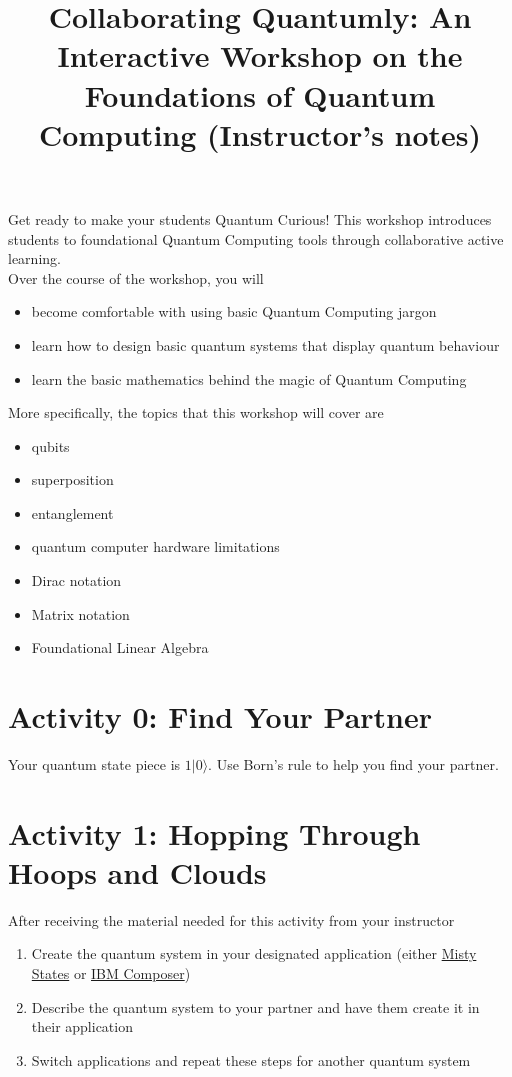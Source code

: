 \documentclass{article}
\title{Collaborating Quantumly: An Interactive Workshop on the Foundations of Quantum Computing (Instructor's notes)}
\begin{document}
\maketitle

Get ready to make your students Quantum Curious! This workshop introduces students to foundational Quantum Computing tools through collaborative active learning.
\\
Over the course of the workshop, you will
\begin{itemize}
    \item become comfortable with using basic Quantum Computing jargon
    \item learn how to design basic quantum systems that display quantum behaviour
    \item learn the basic mathematics behind the magic of Quantum Computing
\end{itemize}

\newline \newline

More specifically, the topics that this workshop will cover are
\begin{itemize}
    \item qubits
    \item superposition
    \item entanglement
    \item quantum computer hardware limitations
    \item Dirac notation
    \item Matrix notation
    \item Foundational Linear Algebra
\end{itemize}


\section{Activity 0: Find Your Partner}

Your quantum state piece is \textbf{$1|0\rangle$}. Use Born's rule to help you find your partner.

\section{Activity 1: Hopping Through Hoops and Clouds}

After receiving the material needed for this activity from your instructor

\begin{enumerate}
    \item Create the quantum system in your designated application (either \href{https://quantumcurious.org/misty-states/}{Misty States} or \href{https://quantum.ibm.com/composer/files/new}{IBM Composer})
    \item Describe the quantum system to your partner and have them create it in their application
    \item Switch applications and repeat these steps for another quantum system
\end{enumerate}
\end{document}
